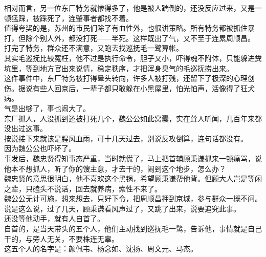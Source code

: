 \begin{multicols}{\theparacolNo}
相对而言，另一位东厂特务就惨得多了，他是被人踹倒的，还没反应过来，又是一顿猛踩，被踩死了，连肇事者都找不着。\\

值得夸奖的是，苏州的市民们除了有血性外，也很讲策略。所有特务都被抓住暴打，但除个别人外，都没打死——半死。这样既出了气，又不至于连累周顺昌。\\

打完了特务，群众还不满意，又跑去找巡抚毛一鹭算帐。\\

其实毛巡抚比较冤枉，他不过是执行命令，胆子又小，吓得魂不附体，只能躲进粪坑里，等到地方官出来说情，稳定秩序，才把浑身臭气的毛巡抚捞出来。\\

这件事件中，东厂特务被打得晕头转向，许多人被打残，还留下了极深的心理创伤。据说有些人回京后，一辈子都只敢躲在小黑屋里，怕光怕声，活像得了狂犬病。\\

气是出够了，事也闹大了。\\

东厂抓人，人没抓到还被打死几个，魏公公如此窝囊，实在耸人听闻，几百年来都没出过这事。\\

按说接下来就该是腥风血雨，可十几天过去，别说反攻倒算，连句话都没有。\\

因为魏公公也吓坏了。\\

事发后，魏忠贤得知事态严重，当时就慌了，马上把首辅顾秉谦抓来一顿痛骂，说他本不想抓人，听了你的馊主意，才去干的，闹到这个地步，怎么办？\\

魏忠贤的意思很明白，他不喜欢这个黑锅，希望顾秉谦帮他背。但顾大人岂是等闲之辈，只磕头不说话，回去就养病，索性不来了。\\

魏公公无计可施，想来想去，只好下令，把周顺昌押到京城，参与群众一概不问。\\

说是这么说，过了几天，顾秉谦看风声过了，又跳了出来，说要追究此事。\\

还没等他动手，就有人自首了。\\

自首的，是当天带头的五个人，他们主动找到巡抚毛一鹭，告诉他，事情就是自己干的，与旁人无关，不要株连无辜。\\

这五个人的名字是：颜佩韦、杨念如、沈扬、周文元、马杰。\\


\end{multicols}
